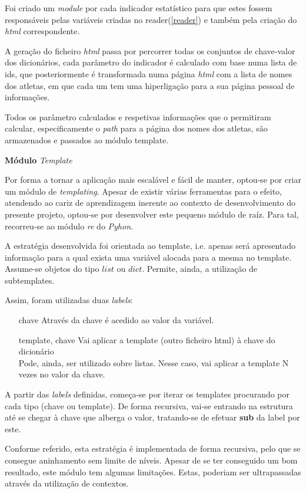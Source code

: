 Foi criado um \textit{module} por cada indicador estatístico para que estes fossem
responsáveis pelas variáveis criadas no reader(\ref{reader}) e também pela criação
do \textit{html} correspondente.

A geração do ficheiro \textit{html} passa por percorrer todas os conjuntos de chave-valor
dos dicionários, cada parâmetro do indicador é calculado com base numa lista de ids, que posteriormente é  
transformada numa página \textit{html} com a lista de nomes dos atletas, em que cada um tem uma hiperligação 
para a sua página pessoal de informações. 

Todos os parâmetro calculados e respetivas informações que o permitiram calcular, especificamente o 
\textit{path} para a página dos nomes dos atletas, são armazenados e passados ao módulo template.

\textbf{Módulo} \textit{Template}

Por forma a tornar a aplicação mais escalável e fácil de manter, optou-se por criar um módulo de \textit{templating}.
Apesar de existir várias ferramentas para o efeito, atendendo ao cariz de aprendizagem inerente ao contexto de desenvolvimento
do presente projeto, optou-se por desenvolver este pequeno módulo de raíz.
Para tal, recorreu-se ao módulo \textit{re} do \textit{Pyhon}.

A estratégia desenvolvida foi orientada ao template,
i.e. apenas será apresentado informação para a qual exista uma variável alocada para a mesma no template.
Assume-se objetos do tipo $list$ ou $dict$. Permite, ainda, a utilização de subtemplates.

Assim, foram utilizadas duas \textit{labels}:
\begin{itemize}
    \item[{{chave}}]{Através da chave é acedido ao valor da variável.}
    \item[{{template, chave}}]{Vai aplicar a template (outro ficheiro html) à chave do dicionário\\
    Pode, ainda, ser utilizado sobre listas. Nesse caso, vai aplicar a template N vezes no valor da chave.}
\end{itemize}

A partir das \textit{labels} definidas, começa-se por iterar os templates procurando por cada tipo (chave ou template).
De forma recursiva, vai-se entrando na estrutura até se chegar à chave que alberga o valor, tratando-se de efetuar \textbf{sub}
da label por este.

Conforme referido, esta estratégia é implementada de forma recursiva, pelo que se consegue aninhamento sem limite de níveis.
Apesar de se ter conseguido um bom resultado, este módulo tem algumas limitações. Estas, poderiam ser ultrapassadas através da utilização de contextos.


